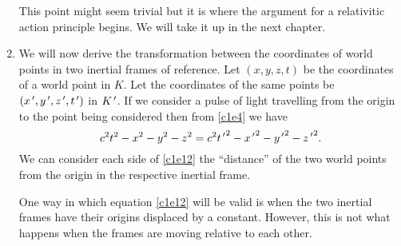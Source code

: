 \begin{enumerate}
This point might seem trivial but it is where the argument for a relativitic
action principle begins. We will take it up in the next chapter.

\item We will now derive the transformation between the coordinates of world
points in two inertial frames of reference. Let $(x, y, z, t)$ be the 
coordinates of a world point in $K$. Let the coordinates of the same points be 
$(x^{\,\prime}, y^{\,\prime}, z^{\,\prime}, t^{\,\prime})$ in $K^{\,\prime}$. If we consider a pulse of light 
travelling from the origin to the point being considered then from \eqref{c1e4} 
we have
\begin{equation}\label{c1e12}
c^2t^2 - x^2 - y^2 - z^2 = c^2{t^{\,\prime}}^2 - {x^{\,\prime}}^2 - {y^{\,\prime}}^2 - {z^{\,\prime}}^2.
\end{equation}
We can consider each side of \eqref{c1e12} the ``distance'' of the two world 
points from the origin in the respective inertial frame. 

One way in which equation \eqref{c1e12} will be valid is when the two inertial
frames have their origins displaced by a constant. However, this is not what
happens when the frames are moving relative to each other.


\end{enumerate}
